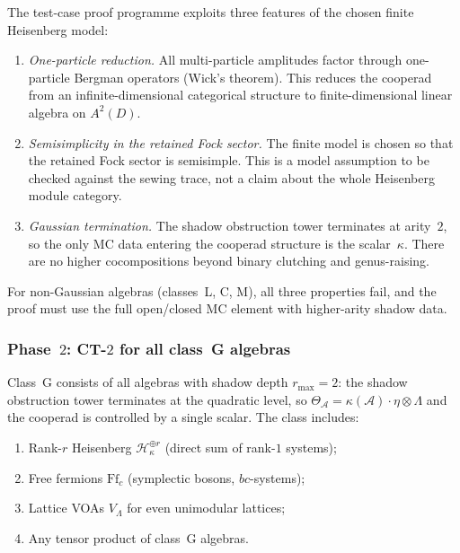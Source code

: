 \documentclass[11pt]{article}
\newcommand{\cA}{\mathcal{A}}
\newcommand{\cH}{\mathcal{H}}
\begin{document}
\begin{remark}
\label{rem:ct2-heisenberg-special}
The test-case proof programme exploits three features of the
chosen finite Heisenberg model:
\begin{enumerate}[label=\textup{(\alph*)},nosep]
\item \emph{One-particle reduction.}  All multi-particle
  amplitudes factor through one-particle Bergman operators
  (Wick's theorem).  This reduces the cooperad from an
  infinite-dimensional categorical structure to
  finite-dimensional linear algebra on $A^2(D)$.
\item \emph{Semisimplicity in the retained Fock sector.}  The
  finite model is chosen so that the retained Fock sector is
  semisimple.  This is a model assumption to be checked against
  the sewing trace, not a claim about the whole Heisenberg module
  category.
\item \emph{Gaussian termination.}  The shadow obstruction tower terminates
  at arity~$2$, so the only MC data entering the cooperad
  structure is the scalar~$\kappa$.  There are no higher
  cocompositions beyond binary clutching and genus-raising.
\end{enumerate}
For non-Gaussian algebras (classes~L, C, M), all three
properties fail, and the proof must use the full open/closed
MC element with higher-arity shadow data.
\end{remark}

\subsubsection*{Phase~$2$: CT-$2$ for all class~G algebras}
\label{par:ct2-phase2}

Class~G consists of all algebras with shadow depth
$r_{\max} = 2$: the shadow obstruction tower terminates at the
quadratic level, so $\Theta_\cA = \kappa(\cA) \cdot \eta
\otimes \Lambda$ and the cooperad is controlled by a
single scalar.  The class includes:

\begin{enumerate}[label=\textup{(\roman*)},nosep]
\item Rank-$r$ Heisenberg $\cH_\kappa^{\oplus r}$
  (direct sum of rank-$1$ systems);
\item Free fermions $\mathrm{Ff}_c$ (symplectic bosons,
  $bc$-systems);
\item Lattice VOAs $V_\Lambda$ for even unimodular lattices;
\item Any tensor product of class~G algebras.
\end{enumerate}
\end{document}
